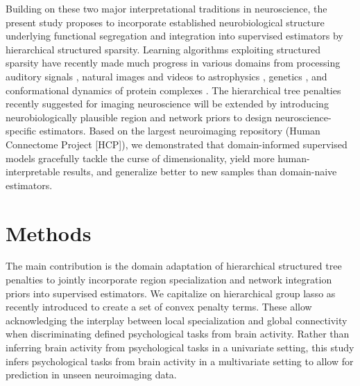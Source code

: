 \documentclass{article}
\begin{document}
Building on these two major interpretational traditions in neuroscience,
the present study proposes to incorporate
established neurobiological structure underlying
functional segregation and integration
into supervised estimators
by hierarchical structured sparsity.
%
Learning algorithms
exploiting structured sparsity 
have recently made much progress in various domains
from processing auditory signals \cite{daudet2004sparse},
natural images \cite{harzallah2009combining} and
videos \cite{kang2015structured}
to
astrophysics \cite{vinci2014estimating},
genetics \cite{kim2012tree},
and
conformational dynamics of protein complexes \cite{jenatton2009structured}.
%
The hierarchical tree penalties recently suggested for imaging neuroscience
\cite{jenatton2011multi} will be extended
by introducing neurobiologically plausible region and network priors
to design neuroscience-specific estimators.
%
Based on the largest neuroimaging repository (Human Connectome Project [HCP]),
we demonstrated that domain-informed supervised models
gracefully tackle the curse of dimensionality,
yield more human-interpretable results,
and generalize better to new samples
than domain-naive estimators.

\section{Methods}
The main contribution is the domain adaptation of hierarchical structured
tree penalties to jointly incorporate region 
specialization and network integration priors into supervised 
estimators.
We capitalize on hierarchical group lasso as recently introduced
\cite{jenatton2011multi} to create a set of convex penalty terms.
These allow acknowledging the interplay between local specialization and 
global connectivity when discriminating defined psychological tasks
from brain activity.
Rather than inferring brain activity from psychological tasks
in a univariate setting,
this study infers psychological tasks from brain activity
in a multivariate setting to allow for
prediction in unseen neuroimaging data.
%
\end{document}
